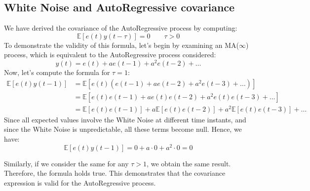 \subsection{White Noise and AutoRegressive covariance}
We have derived the covariance of the AutoRegressive process by computing:
\[\mathbb{E}\left[e(t)y(t-\tau)\right]=0 \qquad \tau >0\]
To demonstrate the validity of this formula, let's begin by examining an MA($\infty$) process, which is equivalent to the AutoRegressive process considered:
\[y(t)=e(t)+ae(t-1)+a^2e(t-2)+\dots\]
Now, let's compute the formula for $\tau = 1$:
\begin{align*}
    \mathbb{E}\left[e(t)y(t-1)\right]   &= \mathbb{E}\left[e(t)\left(e(t-1)+ae(t-2)+a^2e(t-3)+\dots\right)\right] \\ 
                                        &= \mathbb{E}\left[e(t)e(t-1)+ae(t)e(t-2)+a^2e(t)e(t-3)+\dots\right] \\ 
                                        &= \mathbb{E}\left[e(t)e(t-1)\right]+a\mathbb{E}\left[e(t)e(t-2)\right]+a^2\mathbb{E}\left[e(t)e(t-3)\right]+\dots                                      
\end{align*}
Since all expected values involve the  White Noise at different time instants, and since the  White Noise is unpredictable, all these terms become null.
Hence, we have:
\[\mathbb{E}\left[e(t)y(t-1)\right]=0+a\cdot 0+a^2\cdot 0=0\]

Similarly, if we consider the same for any $\tau > 1$, we obtain the same result. 
Therefore, the formula holds true. 
This demonstrates that the covariance expression is valid for the AutoRegressive process.